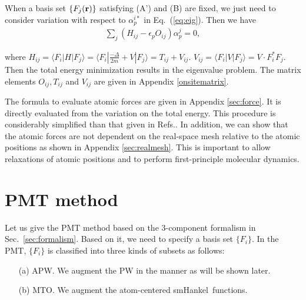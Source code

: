 \documentclass[a4paper,10pt,aip,onecolumn,amsmath,amssymb,floatfix,rmp]{revtex4-1}
\newcommand{\bfr}{{\bf r}}
\newcommand{\bfR}{{\bf R}}
\newcommand{\ooplus}{\oplus}
\newcommand{\oominus}{\ominus}
\newcommand{\req}[1]{\mbox{Eq.~\!(\ref{#1})}}
\newcommand{\refsec}[1]{\mbox{Sec.~\!\ref{#1}}}
\def\smh{smHankel}
\begin{document}
\begin{widetext}
\begin{widetext}
When a basis set $\{F_j(\bfr)\}$ satisfying (A') and (B) are fixed, we
just need to consider variation with respect to $\alpha_{p}^{i*}$ in
\req{eq:eig}. Then we have
\begin{eqnarray}
\sum_j (H_{ij} -\epsilon_p O_{ij}) \alpha_p^j =0,
\label{eq:eigenp}
\end{eqnarray}
\end{widetext}
where $H_{ij}= \langle F_i| H |F_{j} \rangle = 
\langle F_i| \frac{-\Delta}{2m} + V |F_{j} \rangle =T_{ij}+V_{ij}$.
$V_{ij}=\langle F_i|V|F_{j} \rangle=V \cdot F^*_i F_j$. 
Then the total energy minimization results in the eigenvalue problem.
The matrix elements $O_{ij},T_{ij}$
and $V_{ij}$ are given in Appendix \ref{onsitematrix}.

The formula to evaluate atomic forces are given in Appendix
\ref{sec:force}. It is directly evaluated from the variation on the
total energy. This procedure is considerably simplified than that given
in Refs.\cite{lmfchap,molforce}. In addition, we can show that the
atomic forces are not dependent on the real-space mesh relative to the
atomic positions as shown in Appendix \ref{sec:realmesh}. This is
important to allow relaxations of atomic positions and to perform
first-principle molecular dynamics.


\section{PMT method}
\label{sec:pmtmethod} Let us give the PMT method based on the
3-component formalism in \refsec{sec:formalism}. Based on it, we need to
specify a basis set $\{F_i\}$.  In the PMT, $\{F_i\}$ is classified into
three kinds of subsets as follows:
\begin{itemize}
\item[(a)] APW. We augment the PW in the manner as will be shown later.

\item[(b)] MTO. We augment the atom-centered \smh\ functions. 


\end{itemize}
\end{widetext}
\end{document}
